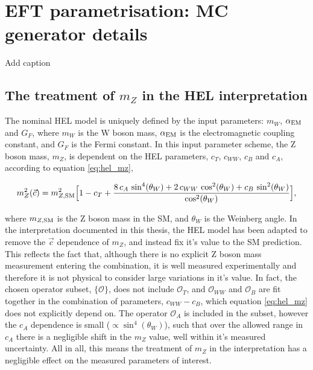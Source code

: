 \chapter{EFT parametrisation: MC generator details}\label{app:generator_options}

\begin{table}[htb!]
  \centering
  \footnotesize
  \renewcommand{\arraystretch}{1.5}
  \setlength{\tabcolsep}{6pt}
  \caption[MC generator details for deriving the EFT parametrisation]
  {
    Add caption
  }
  \label{tab:generator_options}
  
\end{table}

\section{The treatment of $m_Z$ in the HEL interpretation}
The nominal HEL model is uniquely defined by the input parameters: $m_W$, $\alpha_{\rm{EM}}$ and $G_F$, where $m_W$ is the W boson mass, $\alpha_{\rm{EM}}$ is the electromagnetic coupling constant, and $G_F$ is the Fermi constant. In this input parameter scheme, the Z boson mass, $m_Z$, is dependent on the HEL parameters, $c_T$, $c_{WW}$, $c_B$ and $c_A$, according to equation \ref{eq:hel_mz},

\begin{equation}\label{eq:hel_mz}
    m_Z^2(\vec{c}) = m_{Z,\rm{SM}}^2 \Big[ 1-c_T+\frac{8\,c_A\,\sin^4(\theta_W)+2\,c_{WW}\,\cos^2(\theta_W)+c_B\,\sin^2(\theta_W)}{\cos^2(\theta_W)} \Big],
\end{equation}

\noindent
where $m_{Z,\rm{SM}}$ is the Z boson mass in the SM, and $\theta_W$ is the Weinberg angle. In the interpretation documented in this thesis, the HEL model has been adapted to remove the $\vec{c}$ dependence of $m_Z$, and instead fix it's value to the SM prediction. This reflects the fact that, although there is no explicit Z boson mass measurement entering the combination, it is well measured experimentally and therefore it is not physical to consider large variations in it's value. In fact, the chosen operator subset, $\{\mathcal{O}\}$, does not include $\mathcal{O}_T$, and $\mathcal{O}_{WW}$ and $\mathcal{O}_B$ are fit together in the combination of parameters, $c_{WW}-c_B$, which equation \ref{eq:hel_mz} does not explicitly depend on. The operator $\mathcal{O}_A$ is included in the subset, however the $c_A$ dependence is small ($\propto \sin^4(\theta_W)$), such that over the allowed range in $c_A$ there is a negligible shift in the $m_Z$ value, well within it's measured uncertainty. All in all, this means the treatment of $m_Z$ in the interpretation has a negligible effect on the measured parameters of interest.